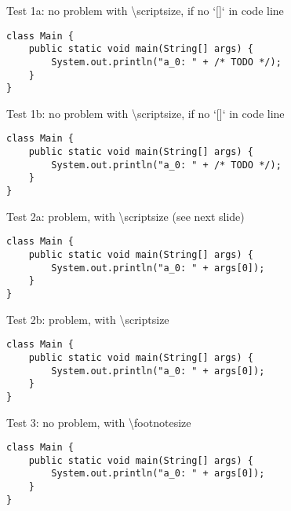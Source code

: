 \documentclass[aspectratio=169]{tudabeamer}
\begin{document}
\begin{frame}[fragile]{Test 1a: no problem with \textbackslash scriptsize, if no `[]` in code line}
    \begin{verbatim}
class Main {
    public static void main(String[] args) {
        System.out.println("a_0: " + /* TODO */);
    }
}
    \end{verbatim}
\end{frame}


\begin{frame}[fragile]{Test 1b: no problem with \textbackslash scriptsize, if no `[]` in code line}
    \begin{verbatim}
class Main {
    public static void main(String[] args) {
        System.out.println("a_0: " + /* TODO */);
    }
}
    \end{verbatim}
\end{frame}


\begin{frame}[fragile]{Test 2a: problem, with \textbackslash scriptsize (see next slide)}
    \begin{verbatim}
class Main {
    public static void main(String[] args) {
        System.out.println("a_0: " + args[0]);
    }
}
    \end{verbatim}
\end{frame}


\begin{frame}[fragile]{Test 2b: problem, with \textbackslash scriptsize}
    \begin{verbatim}
class Main {
    public static void main(String[] args) {
        System.out.println("a_0: " + args[0]);
    }
}
    \end{verbatim}
\end{frame}


\begin{frame}[fragile]{Test 3: no problem, with \textbackslash footnotesize}
    \begin{verbatim}
class Main {
    public static void main(String[] args) {
        System.out.println("a_0: " + args[0]);
    }
}
    \end{verbatim}
\end{frame}
\end{document}
